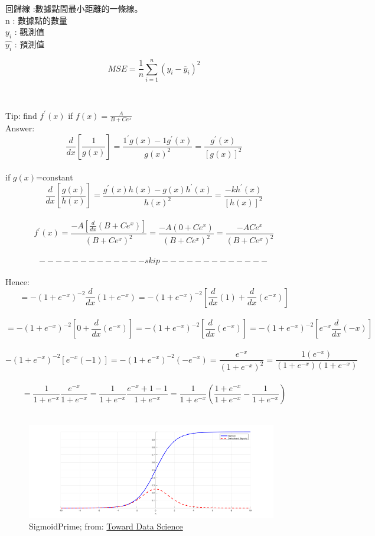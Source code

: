 \documentclass[14pt,a4paper]{report}  %
\begin{document}
\begin{itemize}
回歸線 :數據點間最小距離的一條線。 \\
n : 數據點的數量\\
$y_i$ :  觀測值\\
$\hat{y_i}$ : 預測值\\
\begin{Large}
$$MSE=\frac{1}{n} \sum_{i=1}^n(y_i-\overline{y} _i)^2$$
\end{Large}\\[6pt]
\end{itemize}

\iffalse %
Tip: find $f^{'}(x)$ if $f(x)=\frac{A}{B+Ce^{x}}$\\
Answer:\\
$$\frac{d}{dx}[\frac{1}{g(x)}]=\frac{1^{'}g(x)-1g^{'}(x)}{g(x)^2}=\frac{g^{'}(x)}{[g(x)]^2}$$\\
if $g(x)$=constant\\
$$\frac{d}{dx}[\frac{g(x)}{h(x)}]=\frac{g^{'}(x)h(x)-g(x)h^{'}(x)}{h(x)^2}= \frac{-kh^{'}(x)}{[h(x)]^2}$$\\
$$f^{'}(x)=\frac{-A[\frac{d}{dx}(B+Ce^x)]}{(B+Ce^x)^2}=\frac{-A(0+Ce^x)}{(B+Ce^x)^2}=\frac{-ACe^x}{(B+Ce^x)^2}$$\\[6pt]
$$-------------skip-------------$$\\[6pt]
Hence:\\
$$=-(1+e^{-x})^{-2}\frac{d}{dx}(1+e^{-x})=-(1+e^{-x})^{-2}[\frac{d}{dx}(1)+\frac{d}{dx}(e^{-x})]$$\\
$$=-(1+e^{-x})^{-2}[0+\frac{d}{dx}(e^{-x})]=-(1+e^{-x})^{-2}[\frac{d}{dx}(e^{-x})]=-(1+e^{-x})^{-2}[e^{-x}\frac{d}{dx}(-x)]$$\\
$$-(1+e^{-x})^{-2}[e^{-x}(-1)]=-(1+e^{-x})^{-2}(-e^{-x})=\frac{e^{-x}}{(1+e^{-x})^2}=\frac{1(e^{-x})}{(1+e^{-x})(1+e^{-x})}$$\\
$$=\frac{1}{1+e^{-x}}\frac{e^{-x}}{1+e^{-x}}=\frac{1}{1+e^{-x}}\frac{e^{-x}+1-1}{1+e^{-x}}=\frac{1}{1+e^{-x}}(\frac{1+e^{-x}}{1+e^{-x}}-\frac{1}{1+e^{-x}})$$\\[6pt]


\begin{figure}[hbt!]
\begin{center}
\includegraphics[scale=0.80]{sigmoidprime}
\caption{SigmoidPrime; from: \href{https://towardsdatascience.com/derivative-of-the-sigmoid-function-536880cf918e}{Toward Data Science}}
\end{center}
\end{figure}
\end{document}
